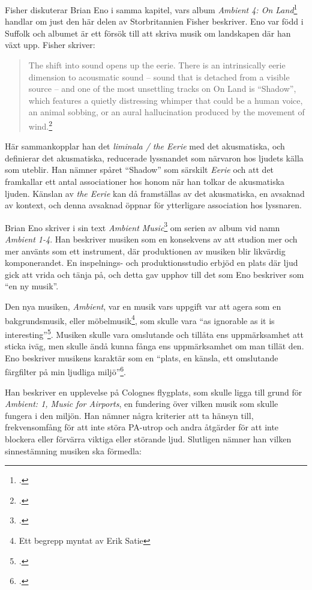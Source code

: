 \documentclass{article}
\begin{document}
Fisher diskuterar Brian Eno i samma kapitel, vars album \emph{Ambient 4: On Land}\footcite{EnoLand} handlar om
just den här delen av Storbritannien Fisher beskriver. Eno var född i Suffolk och albumet är ett försök till
att skriva musik om landskapen där han växt upp. Fisher skriver:
\pagebreak
\begin{quote}
The shift into sound opens up the eerie. There is an intrinsically eerie dimension to acousmatic sound -- sound
that is detached from a visible source -- and one of the most unsettling tracks on On Land is ``Shadow'', which
features a quietly distressing whimper that could be a human voice, an animal sobbing, or an aural
hallucination produced by the movement of wind.\footcite[81]{Fisher}
\end{quote}
Här sammankopplar han det \emph{liminala / the Eerie} med det akusmatiska, och definierar det akusmatiska,
reducerade lyssnandet som närvaron hos ljudets källa som uteblir. Han nämner spåret ``Shadow'' som särskilt
\emph{Eerie} och att det framkallar ett antal associationer hos honom när han tolkar de akusmatiska ljuden.
Känslan av \emph{the Eerie} kan då framställas av det akusmatiska, en avsaknad av kontext, och denna avsaknad
öppnar för ytterligare association hos lyssnaren.

Brian Eno skriver i sin text \emph{Ambient Music}\footcite[149-153]{Eno} om serien av album vid namn
\emph{Ambient 1-4}. Han beskriver musiken som en konsekvens av att studion mer och mer använts som ett
instrument, där produktionen av musiken blir likvärdig komponerandet. En inspelnings- och produktionsstudio
erbjöd en plats där ljud gick att vrida och tänja på, och detta gav upphov till det som Eno beskriver som ``en
ny musik''.

Den nya musiken, \emph{Ambient}, var en musik vars uppgift var att agera som en bakgrundsmusik, eller
möbelmusik\footnote{Ett begrepp myntat av Erik Satie}, som skulle vara ``as ignorable as it is
interesting''\footcite{Airports}. Musiken skulle vara omslutande och tillåta ens uppmärksamhet att sticka
iväg, men skulle ändå kunna fånga ens uppmärksamhet om man tillät den. Eno beskriver musikens karaktär som en
``plats, en känsla, ett omslutande färgfilter på min ljudliga miljö''\footcite[Egen översättning, s. 151]{Eno}.

Han beskriver en upplevelse på Colognes flygplats, som skulle ligga till grund för \emph{Ambient: 1, Music for
Airports}, en fundering över vilken musik som skulle fungera i den miljön. Han nämner några kriterier att ta
hänsyn till, frekvensomfång för att inte störa PA-utrop och andra åtgärder för att inte blockera eller
förvärra viktiga eller störande ljud. Slutligen nämner han vilken sinnestämning musiken ska förmedla:
\end{document}
